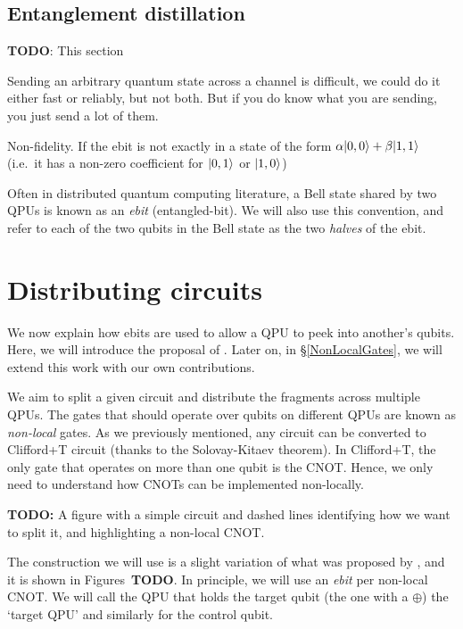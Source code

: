 \subsection{Entanglement distillation}
\label{Distillation}

\textbf{TODO}: This section

Sending an arbitrary quantum state across a channel is difficult, we could do it either fast or reliably, but not both. But if you do know what you are sending, you just send a lot of them.

Non-fidelity. If the ebit is not exactly in a state of the form \(\alpha\vert 0,0 \rangle + \beta\vert 1,1 \rangle\) (i.e.\ it has a non-zero coefficient for \(\vert 0,1 \rangle\) or \(\vert 1,0 \rangle\))

Often in distributed quantum computing literature, a Bell state shared by two QPUs is known as an \textit{ebit} (entangled-bit). We will also use this convention, and refer to each of the two qubits in the Bell state as the two \textit{halves} of the ebit.

\section{Distributing circuits}
\label{IntroDistributing}

We now explain how ebits are used to allow a QPU to peek into another's qubits. Here, we will introduce the proposal of \citet{NonLocalCNOT}. Later on, in \S\ref{NonLocalGates}, we will extend this work with our own contributions. 

We aim to split a given circuit and distribute the fragments across multiple QPUs. The gates that should operate over qubits on different QPUs are known as \textit{non-local} gates. As we previously mentioned, any circuit can be converted to Clifford+T circuit (thanks to the Solovay-Kitaev theorem). In Clifford+T, the only gate that operates on more than one qubit is the CNOT. Hence, we only need to understand how CNOTs can be implemented non-locally.

\textbf{TODO:} A figure with a simple circuit and dashed lines identifying how we want to split it, and highlighting a non-local CNOT.

The construction we will use is a slight variation of what was proposed by \citet{NonLocalCNOT}, and it is shown in Figures~\textbf{TODO}. In principle, we will use an \textit{ebit} per non-local CNOT. We will call the QPU that holds the target qubit (the one with a \(\oplus\)) the `target QPU' and similarly for the control qubit. 

